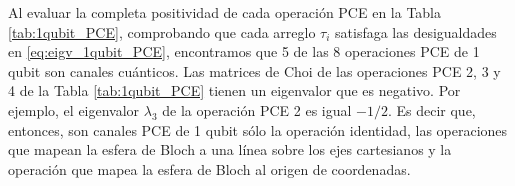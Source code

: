 Al evaluar la completa positividad de cada operación PCE en la Tabla
\ref{tab:1qubit_PCE}, comprobando que cada arreglo $\tau_i$ 
satisfaga las desigualdades en \eqref{eq:eigv_1qubit_PCE},
encontramos que 5 de las 8 operaciones PCE de 1 qubit
son canales cuánticos. Las matrices de Choi de las operaciones PCE 
2, 3 y 4 de la Tabla \ref{tab:1qubit_PCE} tienen un eigenvalor que es negativo. 
Por ejemplo, el eigenvalor $\lambda_3$ de la operación PCE 2 
es igual $-1/2$. Es decir que, entonces, son canales PCE de 1 qubit 
sólo la operación identidad, las operaciones que 
mapean la esfera de Bloch a una línea sobre los ejes cartesianos y la 
operación que mapea la esfera de Bloch al origen de coordenadas.

%
%
%


